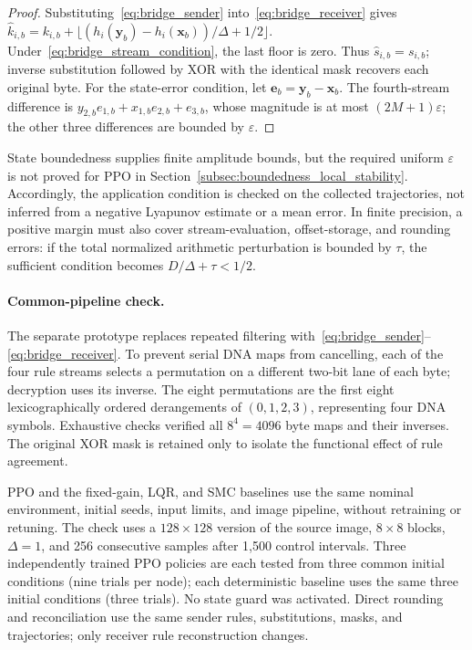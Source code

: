 \begin{proof}
Substituting~\eqref{eq:bridge_sender} into~\eqref{eq:bridge_receiver} gives $\widehat k_{i,b}=k_{i,b}+\lfloor (h_i(\mathbf{y}_b)-h_i(\mathbf{x}_b))/\Delta+1/2\rfloor$. Under~\eqref{eq:bridge_stream_condition}, the last floor is zero. Thus $\widehat s_{i,b}=s_{i,b}$; inverse substitution followed by XOR with the identical mask recovers each original byte. For the state-error condition, let $\mathbf{e}_b=\mathbf{y}_b-\mathbf{x}_b$. The fourth-stream difference is $y_{2,b}e_{1,b}+x_{1,b}e_{2,b}+e_{3,b}$, whose magnitude is at most $(2M+1)\varepsilon$; the other three differences are bounded by $\varepsilon$.
\end{proof}

State boundedness supplies finite amplitude bounds, but the required uniform $\varepsilon$ is not proved for PPO in Section~\ref{subsec:boundedness_local_stability}. Accordingly, the application condition is checked on the collected trajectories, not inferred from a negative Lyapunov estimate or a mean error. In finite precision, a positive margin must also cover stream-evaluation, offset-storage, and rounding errors: if the total normalized arithmetic perturbation is bounded by $\tau$, the sufficient condition becomes $D/\Delta+\tau<1/2$.

\paragraph{Common-pipeline check.}
The separate prototype replaces repeated filtering with~\eqref{eq:bridge_sender}--\eqref{eq:bridge_receiver}. To prevent serial DNA maps from cancelling, each of the four rule streams selects a permutation on a different two-bit lane of each byte; decryption uses its inverse. The eight permutations are the first eight lexicographically ordered derangements of $(0,1,2,3)$, representing four DNA symbols. Exhaustive checks verified all $8^4=4096$ byte maps and their inverses. The original XOR mask is retained only to isolate the functional effect of rule agreement.

PPO and the fixed-gain, LQR, and SMC baselines use the same nominal environment, initial seeds, input limits, and image pipeline, without retraining or retuning. The check uses a $128\times128$ version of the source image, $8\times8$ blocks, $\Delta=1$, and 256 consecutive samples after 1,500 control intervals. Three independently trained PPO policies are each tested from three common initial conditions (nine trials per node); each deterministic baseline uses the same three initial conditions (three trials). No state guard was activated. Direct rounding and reconciliation use the same sender rules, substitutions, masks, and trajectories; only receiver rule reconstruction changes.

